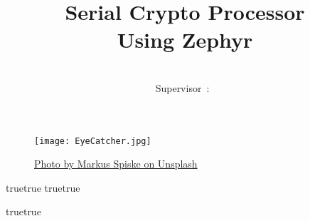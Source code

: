 \documentclass[12pt,a4paper,fleqn,leqno,openany]{article}
\title{Serial Crypto Processor\\ Using Zephyr}
\author{\Schueler\\Supervisor~:~\Lehrer}
\newcommand{\true}{true}
\newcommand{\ToC}{true} %
\newcommand{\LoF}{true} %
\newcommand{\LoL}{true} %
\begin{document}

\captionsetup[figure]{list=no}

\begin{titlepage}
	\maketitle
	\begin{figure}[!ht]
		\begin{center}
			\texttt{[image: EyeCatcher.jpg]}
			\caption{
				\href{https://unsplash.com/photos/FXFz-sW0uwo?utm_source=unsplash&utm_medium=referral&utm_content=creditShareLink}
				{Photo by Markus Spiske on Unsplash}
			}
		\end{center}
	\end{figure}
\end{titlepage}

\captionsetup[figure]{list=yes}

\pagebreak

\thispagestyle{empty}

\ifx\ToC\true
	\tableofcontents
\fi
\pagebreak
\thispagestyle{empty}
\ifx\LoF\true
	\let\oldnumberline\numberline
	\renewcommand{\numberline}[1]{\hspace*{-1.5em}}
	\renewcommand\listfigurename{Figures}
	\listoffigures
	\let\numberline\oldnumberline
\fi
\ifx\LoL\true
	\lstlistoflistings
\fi

\pagebreak



\end{document}

